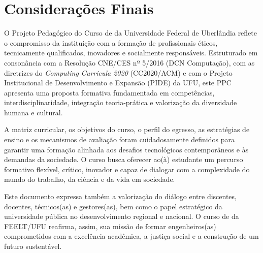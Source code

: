 \chapter{Considerações Finais}

O Projeto Pedagógico do Curso de \ppccurso da Universidade Federal de Uberlândia reflete o compromisso da instituição com a formação de profissionais éticos, tecnicamente qualificados, inovadores e socialmente responsáveis. Estruturado em consonância com a Resolução CNE/CES nº 5/2016 (DCN Computação), com as diretrizes do \textit{Computing Curricula 2020} (CC2020/ACM) e com o Projeto Institucional de Desenvolvimento e Expansão (PIDE) da UFU, este PPC apresenta uma proposta formativa fundamentada em competências, interdisciplinaridade, integração teoria-prática e valorização da diversidade humana e cultural.

A matriz curricular, os objetivos do curso, o perfil do egresso, as estratégias de ensino e os mecanismos de avaliação foram cuidadosamente definidos para garantir uma formação alinhada aos desafios tecnológicos contemporâneos e às demandas da sociedade. O curso busca oferecer ao(à) estudante um percurso formativo flexível, crítico, inovador e capaz de dialogar com a complexidade do mundo do trabalho, da ciência e da vida em sociedade.

Este documento expressa também a valorização do diálogo entre discentes, docentes, técnicos(as) e gestores(as), bem como o papel estratégico da universidade pública no desenvolvimento regional e nacional. O curso de \ppccurso da FEELT/UFU reafirma, assim, sua missão de formar engenheiros(as) comprometidos com a excelência acadêmica, a justiça social e a construção de um futuro sustentável.
